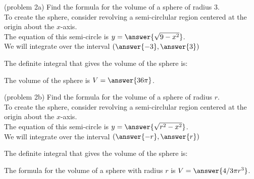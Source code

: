 \documentclass{ximera}
\begin{document}
\begin{problem}(problem 2a)
Find the formula for the volume of a sphere of radius $3$.\\

To create the sphere, consider revolving a semi-circlular region centered at the origin about the $x$-axis.\\
The equation of this semi-circle is $y = \answer{\sqrt{9-x^2}}$.\\
We will integrate over the interval $\left(\answer{-3},\answer{3}\right)$

The definite integral that gives the volume of the sphere is:\\
\begin{multipleChoice}
\end{multipleChoice}

The volume of the sphere is $V = \answer{36 \pi }$.


\end{problem}



\begin{problem}(problem 2b)
Find the formula for the volume of a sphere of radius $r$.\\

To create the sphere, consider revolving a semi-circlular region centered at the origin about the $x$-axis.\\
The equation of this semi-circle is $y = \answer{\sqrt{r^2-x^2}}$.\\
We will integrate over the interval $\left(\answer{-r},\answer{r}\right)$

The definite integral that gives the volume of the sphere is:\\
\begin{multipleChoice}
\end{multipleChoice}

The formula for the volume of a sphere with radius $r$ is $V = \answer{4/3 \pi r^3 }$.
\end{problem}
\end{document}
